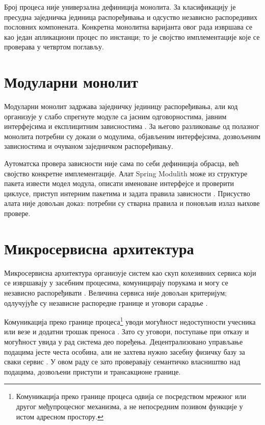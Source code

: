 \documentclass[12pt,oneside]{memoir}
\begin{document}
Број процеса није универзална дефиниција монолита. За класификацију је
пресудна заједничка јединица распоређивања и одсуство независно распоредивих
пословних компонената. Конкретна монолитна варијанта овог рада извршава се као
један апликациони процес по инстанци; то је својство имплементације које се
проверава у четвртом поглављу.


\section{Модуларни монолит}

Модуларни монолит задржава заједничку јединицу распоређивања, али код организује
у слабо спрегнуте модуле са јасним одговорностима, јавним интерфејсима и
експлицитним зависностима \cite{su2024modularMonolith}. За његово разликовање
од полазног монолита потребни су докази о модулима, објављеним интерфејсима,
дозвољеним зависностима и очуваном заједничком распоређивању.

Аутоматска провера зависности није сама по себи дефиниција обрасца, већ
својство конкретне имплементације. Алат {\lat Spring Modulith} може из структуре
пакета извести модел модула, описати именоване интерфејсе и проверити циклусе,
приступ интерним пакетима и задата правила зависности
\cite{springModulith2026fundamentals}. Присуство алата није довољан доказ:
потребни су стварна правила и поновљив излаз њихове провере.

\section{Микросервисна архитектура}

Микросервисна архитектура организује систем као скуп кохезивних сервиса који
се извршавају у засебним процесима, комуницирају порукама и могу се независно
распоређивати \cite{dragoni2017microservices}. Величина сервиса није довољан
критеријум; одлучујуће су независне распоредне границе и уговори сарадње
\cite{lewis2014microservices}.

Комуникација преко границе процеса\footnote{Комуникација преко границе процеса
	одвија се посредством мрежног или другог међупроцесног механизма, а не
	непосредним позивом функције у истом адресном простору.} уводи могућност
недоступности учесника или везе и додатни трошак преноса
\cite{lewis2014microservices,dragoni2017microservices}. Зато су уговори,
поступање при отказу и могућност увида у рад система део поређења.
Децентрализовано управљање подацима јесте честа особина, али не захтева нужно
засебну физичку базу за сваки сервис \cite{lewis2014microservices}. У овом раду
се зато проверавају семантичко власништво над подацима, дозвољени приступи и
трансакционе границе.
\end{document}
